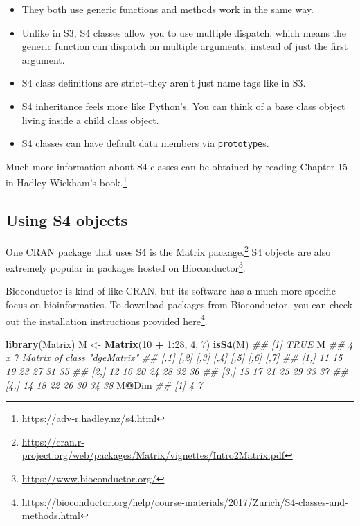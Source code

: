 \documentclass[12pt,krantz2]{krantz}
\makeatletter
\newenvironment{Shaded}{\begin{snugshade}}{\end{snugshade}}
\newcommand{\CommentTok}[1]{\textcolor[rgb]{0.37,0.37,0.37}{\textit{#1}}}
\newcommand{\DecValTok}[1]{\textcolor[rgb]{0.06,0.06,0.06}{#1}}
\newcommand{\KeywordTok}[1]{\textcolor[rgb]{0.27,0.27,0.27}{\textbf{#1}}}
\newcommand{\NormalTok}[1]{#1}
\newcommand{\OperatorTok}[1]{\textcolor[rgb]{0.43,0.43,0.43}{\textbf{#1}}}
\newcommand{\StringTok}[1]{\textcolor[rgb]{0.5,0.5,0.5}{#1}}
\providecommand{\tightlist}{%
  \setlength{\itemsep}{0pt}\setlength{\parskip}{0pt}}
\renewcommand{\href}[2]{#2\footnote{\url{#1}}}
\newenvironment{kframe}{%
\medskip{}
\setlength{\fboxsep}{.8em}
 \def\at@end@of@kframe{}%
 \ifinner\ifhmode%
  \def\at@end@of@kframe{\end{minipage}}%
  \begin{minipage}{\columnwidth}%
 \fi\fi%
 \def\FrameCommand##1{\hskip\@totalleftmargin \hskip-\fboxsep
 \colorbox{shadecolor}{##1}\hskip-\fboxsep
     \hskip-\linewidth \hskip-\@totalleftmargin \hskip\columnwidth}%
 \MakeFramed {\advance\hsize-\width
   \@totalleftmargin\z@ \linewidth\hsize
   \@setminipage}}%
 {\par\unskip\endMakeFramed%
 \at@end@of@kframe}
\renewenvironment{Shaded}{\begin{kframe}}{\end{kframe}}
\makeatother
\begin{document}
\begin{itemize}
\tightlist
\item
  They both use generic functions and methods work in the same way.
\item
  Unlike in S3, S4 classes allow you to use multiple dispatch, which means the generic function can dispatch on multiple arguments, instead of just the first argument.
\item
  S4 class definitions are strict--they aren't just name tags like in S3.
\item
  S4 inheritance feels more like Python's. You can think of a base class object living inside a child class object.
\item
  S4 classes can have default data members via \texttt{prototype}s.
\end{itemize}

Much more information about S4 classes can be obtained by reading \href{https://adv-r.hadley.nz/s4.html}{Chapter 15 in Hadley Wickham's book.}

\hypertarget{using-s4-objects}{%
\subsection{Using S4 objects}\label{using-s4-objects}}

One CRAN package that uses S4 is the \href{https://cran.r-project.org/web/packages/Matrix/vignettes/Intro2Matrix.pdf}{Matrix package.} S4 objects are also extremely popular in packages hosted on \href{https://www.bioconductor.org/}{Bioconductor}.

\begin{rmd-details}
Bioconductor is kind of like CRAN, but its software has a much more specific focus on bioinformatics. To download packages from Bioconductor, you can check out the installation instructions provided \href{https://bioconductor.org/help/course-materials/2017/Zurich/S4-classes-and-methods.html}{here}.

\end{rmd-details}

\begin{Shaded}
\begin{Highlighting}[]
\KeywordTok{library}\NormalTok{(Matrix)}
\NormalTok{M <-}\StringTok{ }\KeywordTok{Matrix}\NormalTok{(}\DecValTok{10} \OperatorTok{+}\StringTok{ }\DecValTok{1}\OperatorTok{:}\DecValTok{28}\NormalTok{, }\DecValTok{4}\NormalTok{, }\DecValTok{7}\NormalTok{)}
\KeywordTok{isS4}\NormalTok{(M)}
\CommentTok{## [1] TRUE}
\NormalTok{M}
\CommentTok{## 4 x 7 Matrix of class "dgeMatrix"}
\CommentTok{##      [,1] [,2] [,3] [,4] [,5] [,6] [,7]}
\CommentTok{## [1,]   11   15   19   23   27   31   35}
\CommentTok{## [2,]   12   16   20   24   28   32   36}
\CommentTok{## [3,]   13   17   21   25   29   33   37}
\CommentTok{## [4,]   14   18   22   26   30   34   38}
\NormalTok{M}\OperatorTok{@}\NormalTok{Dim}
\CommentTok{## [1] 4 7}
\end{Highlighting}
\end{Shaded}
\end{document}
